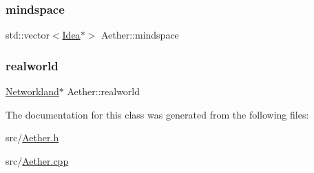\subsubsection{\texorpdfstring{mindspace}{mindspace}}
{\footnotesize\ttfamily std\+::vector$<$\hyperlink{classIdea}{Idea}$\ast$$>$ Aether\+::mindspace\hspace{0.3cm}{\ttfamily [private]}}

\mbox{\label{classAether_ad7e88c3d473a78ba840eab68adc06d04}} 
\subsubsection{\texorpdfstring{realworld}{realworld}}
{\footnotesize\ttfamily \hyperlink{classNetworkland}{Networkland}$\ast$ Aether\+::realworld\hspace{0.3cm}{\ttfamily [private]}}



The documentation for this class was generated from the following files\+:\begin{DoxyCompactItemize}
\item 
src/\hyperlink{Aether_8h}{Aether.\+h}\item 
src/\hyperlink{Aether_8cpp}{Aether.\+cpp}\end{DoxyCompactItemize}

